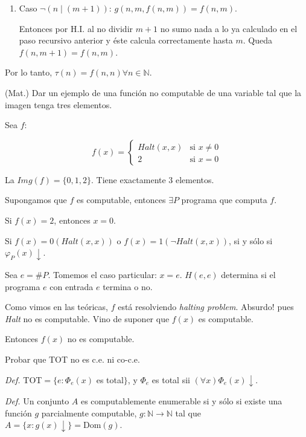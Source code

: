 \begin{questions}
\begin{solution}
\begin{itemize}
\begin{enumerate}[1.]
   \item Caso $\neg (n \mid (m+1))$: $g(n,m,f(n,m)) = f(n,m)$. 
   
    Entonces por H.I. al no dividir $m+1$ no sumo nada a lo ya calculado en el paso recursivo anterior y éste calcula correctamente hasta $m$. Queda $f(n,m+1)=f(n,m)$.
  \end{enumerate}

 Por lo tanto, $\tau(n) = f(n,n) \forall n \in \mathbb{N}$.
 
\end{itemize}

\end{solution} 

\question (Mat.) Dar un ejemplo de una funci\'on no computable de una variable tal que la imagen tenga tres elementos. 

\begin{solution}
Sea $f$: 

$$
f(x) = \left\{
\begin{array}{cl}
Halt(x,x) & \mbox{si } x \neq 0 \\
2 & \mbox{si } x = 0
\end{array}\right.
$$

La $Img(f) = \{0,1,2\}$. Tiene exactamente 3 elementos.

Supongamos que $f$ es computable, entonces $\exists P$ programa que computa $f$. 

Si $f(x) = 2$, entonces $x = 0$. 

Si $f(x) = 0 (Halt(x,x))$ o $f(x) = 1 (\neg Halt(x,x))$, si y s\'olo si $\varphi_P(x)\downarrow$.

Sea $e = \#P$. Tomemos el caso particular: $x = e$. $H(e,e)$ determina si el programa $e$ con entrada $e$ termina o no. 

Como vimos en las te\'oricas, $f$ est\'a resolviendo {\it halting problem}. Absurdo! pues {\it Halt} no es computable. Vino de suponer que $f(x)$ es computable. 

Entonces $f(x)$ no es computable. 

\end{solution}

\question Probar que TOT no es c.e. ni co-c.e.

\begin{solution}

 {\it Def. } TOT$=\{ e : \Phi_e(x)$ es total$\}$, y $\Phi_e$ es total sii $(\forall x)\Phi_e(x)\downarrow$.
 
 {\it Def. } Un conjunto $A$ es computablemente enumerable si y s\'olo si existe una funci\'on $g$ parcialmente computable, $g: \mathbb{N} \rightarrow \mathbb{N}$ tal que $A = \{x : g(x)\downarrow \} = \text{Dom}(g)$.


\end{solution}
\end{questions}
